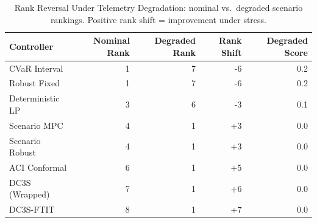 \begin{table}[htbp]
\centering
\caption{Rank Reversal Under Telemetry Degradation: nominal vs.\ degraded scenario rankings.  Positive rank shift = improvement under stress.}
\label{tab:rank_reversal}
\begin{tabular}{lrrrr}
\toprule
Controller & Nominal Rank & Degraded Rank & Rank Shift & Degraded Score \\
\midrule
CVaR Interval & 1 & 7 & -6 & 0.2 \\
Robust Fixed & 1 & 7 & -6 & 0.2 \\
Deterministic LP & 3 & 6 & -3 & 0.1 \\
Scenario MPC & 4 & 1 & +3 & 0.0 \\
Scenario Robust & 4 & 1 & +3 & 0.0 \\
ACI Conformal & 6 & 1 & +5 & 0.0 \\
DC3S (Wrapped) & 7 & 1 & +6 & 0.0 \\
DC3S-FTIT & 8 & 1 & +7 & 0.0 \\
\bottomrule
\end{tabular}
\end{table}